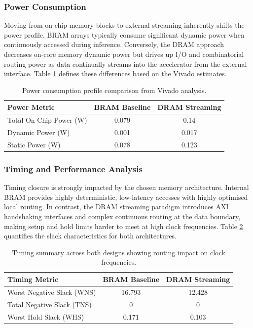 \documentclass[11pt,a4paper]{article}
\begin{document}
\subsubsection{Power Consumption}
Moving from on-chip memory blocks to external streaming inherently shifts the power profile. BRAM arrays typically consume significant dynamic power when continuously accessed during inference. Conversely, the DRAM approach decreases on-core memory dynamic power but drives up I/O and combinatorial routing power as data continually streams into the accelerator from the external interface. Table \ref{tab:power_comparison} defines these differences based on the Vivado estimates.

\begin{table}[ht]
    \centering
    \renewcommand{\arraystretch}{1.2}
    \begin{tabular}{l c c}
        \hline
        \textbf{Power Metric} & \textbf{BRAM Baseline} & \textbf{DRAM Streaming} \\
        \hline
        Total On-Chip Power (W) & 0.079 & 0.14 \\
        Dynamic Power (W)       & 0.001 & 0.017 \\
        Static Power (W)        & 0.078 & 0.123 \\
        \hline
    \end{tabular}
    \caption{Power consumption profile comparison from Vivado analysis.}
    \label{tab:power_comparison}
\end{table}

\subsubsection{Timing and Performance Analysis}
Timing closure is strongly impacted by the chosen memory architecture. Internal BRAM provides highly deterministic, low-latency accesses with highly optimised local routing. In contrast, the DRAM streaming paradigm introduces AXI handshaking interfaces and complex continuous routing at the data boundary, making setup and hold limits harder to meet at high clock frequencies. Table \ref{tab:timing_comparison} quantifies the slack characteristics for both architectures.

\begin{table}[ht]
    \centering
    \renewcommand{\arraystretch}{1.2}
    \begin{tabular}{l c c}
        \hline
        \textbf{Timing Metric} & \textbf{BRAM Baseline} & \textbf{DRAM Streaming} \\
        \hline
        Worst Negative Slack (WNS)  & 16.793 & 12.428 \\
        Total Negative Slack (TNS)  & 0 & 0 \\
        Worst Hold Slack (WHS)      & 0.171 & 0.103 \\
        \hline
    \end{tabular}
    \caption{Timing summary across both designs showing routing impact on clock frequencies.}
    \label{tab:timing_comparison}
\end{table}
\end{document}
